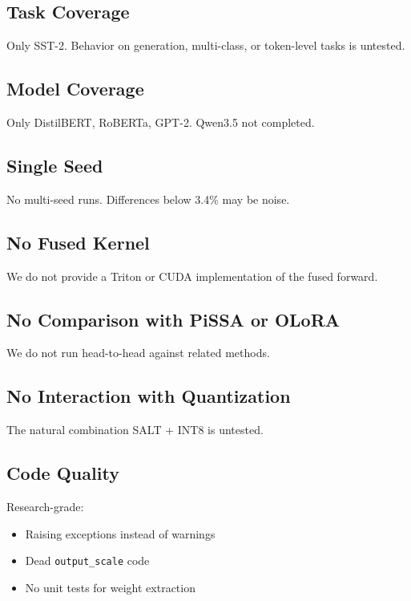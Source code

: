 \subsection{Task Coverage}

Only SST-2. Behavior on generation, multi-class, or token-level tasks is 
untested.

\subsection{Model Coverage}

Only DistilBERT, RoBERTa, GPT-2. Qwen3.5 not completed.

\subsection{Single Seed}

No multi-seed runs. Differences below 3.4\% may be noise.

\subsection{No Fused Kernel}

We do not provide a Triton or CUDA implementation of the fused forward.

\subsection{No Comparison with PiSSA or OLoRA}

We do not run head-to-head against related methods.

\subsection{No Interaction with Quantization}

The natural combination SALT + INT8 is untested.

\subsection{Code Quality}

Research-grade:
\begin{itemize}
\item Raising exceptions instead of warnings
\item Dead \texttt{output\_scale} code
\item No unit tests for weight extraction

\end{itemize}
